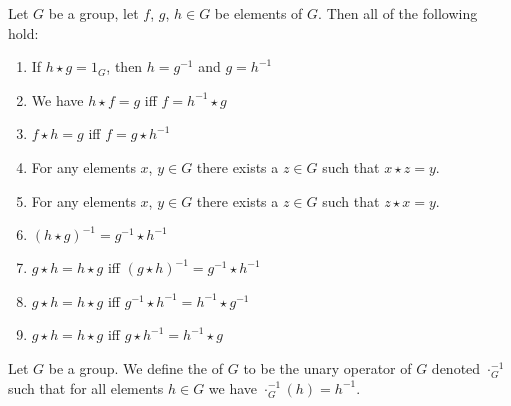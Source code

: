 \vfill\break
\begin{theorem}
Let $G$ be a group, let $f$, $g$, $h\in G$ be elements of $G$. Then
all of the following hold:
\begin{enumerate}
\item If $h\star g=1_{G}$, then $h=g^{-1}$ and $g=h^{-1}$
\item We have $h\star f=g$ iff $f=h^{-1}\star g$
\item $f\star h=g$ iff $f=g\star h^{-1}$
\item For any elements $x$, $y\in G$ there exists a $z\in G$ such that
  $x\star z=y$.
\item For any elements $x$, $y\in G$ there exists a $z\in G$ such that
  $z\star x=y$.
\item $(h\star g)^{-1}=g^{-1}\star h^{-1}$
\item $g\star h=h\star g$ iff $(g\star h)^{-1}=g^{-1}\star h^{-1}$
\item $g\star h=h\star g$ iff $g^{-1}\star h^{-1}=h^{-1}\star g^{-1}$
\item $g\star h=h\star g$ iff $g\star h^{-1}=h^{-1}\star g$
\end{enumerate}
\end{theorem}

\begin{definition}
Let $G$ be a group. We define the  of $G$ to
be the unary operator of $G$ denoted $\cdot_{G}^{-1}$ such that for
all elements $h\in G$ we have $\cdot_{G}^{-1}(h)=h^{-1}$.
\end{definition}